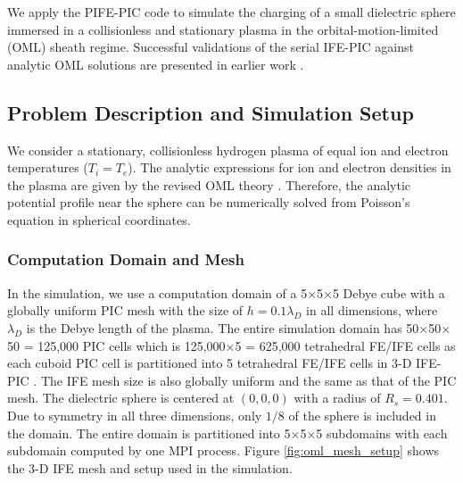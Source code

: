 \documentclass{siamart171218}
\newcommand{\X}{$\times$}
\begin{document}
We apply the PIFE-PIC code to simulate the charging of a small dielectric
sphere immersed in a collisionless and stationary plasma
in the orbital-motion-limited (OML) sheath regime.
Successful validations of the serial IFE-PIC against analytic OML solutions are
presented in earlier work \cite{Han_ife_jcp2016,Han_ieee2016_charging}.

\subsection{Problem Description and Simulation Setup}

We consider a stationary, collisionless hydrogen plasma
of equal ion and electron temperatures ($T_i = T_e$).
The analytic expressions for ion and electron densities in the plasma are given by
the revised OML theory \cite{tang_pop2014_oml,delzanno_pop2015_oml_vs_pic}.
Therefore, the analytic potential profile near the sphere can be numerically solved
from Poisson's equation in spherical coordinates.

\subsubsection{Computation Domain and Mesh}

In the simulation, we use a computation domain of a 5\X 5\X 5
Debye cube with a globally uniform PIC mesh
with the size of $h = 0.1 \lambda_D$ in all dimensions,
where $\lambda_D$ is the Debye length of the plasma.
The entire simulation domain has 50\X 50\X 50 = 125,000 PIC cells
which is 125,000\X 5 = 625,000 tetrahedral FE/IFE cells
as each cuboid PIC cell is partitioned into 5 tetrahedral FE/IFE cells
in 3-D IFE-PIC \cite{Han_ife_jcp2016,Han_ieee2016_charging}.
The IFE mesh size is also globally uniform and the same as that of the PIC mesh.
The dielectric sphere is centered at $(0,0,0)$ with a radius of $R_s = 0.401$.
Due to symmetry in all three dimensions, only $1/8$ of the sphere is included in the domain.
The entire domain is partitioned into 5$\times$5$\times$5 subdomains
with each subdomain computed by one MPI process.
Figure \ref{fig:oml_mesh_setup} shows the 3-D IFE mesh
and setup used in the simulation.
\end{document}
